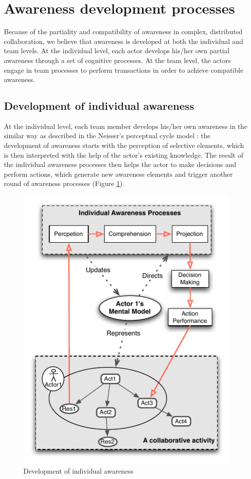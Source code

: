 \section{Awareness development processes} %
\label{sec:awareness_processes}
Because of the partiality and compatibility of awareness in complex, distributed collaboration, we believe that awareness is developed at both the individual and team levels. At the individual level, each actor develops his/her own partial awareness through a set of cognitive processes. At the team level, the actors engage in team processes to perform transactions in order to achieve compatible awareness. 

\subsection{Development of individual awareness} %
\label{sub:development_of_individual_awareness}
At the individual level, each team member develops his/her own awareness in the similar way as described in the Neisser's perceptual cycle model \cite{neisser1976cognition}: the development of awareness starts with the perception of selective elements, which is then interpreted with the help of the actor's existing knowledge. The result of the individual awareness processes then helps the actor to make decisions and perform actions, which generate new awareness elements and trigger another round of awareness processes (Figure \ref{fig:individual_processes}). 

\begin{figure}[htbp] %
   \centering
   \includegraphics{individual_processes.pdf} 
   \caption{Development of individual awareness}
   \label{fig:individual_processes}
\end{figure}

